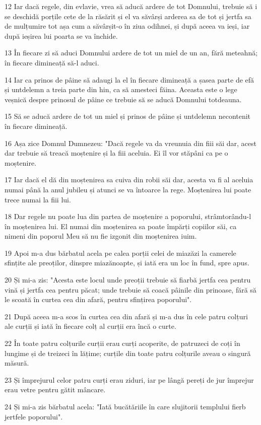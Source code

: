 \par 12 Iar dacă regele, din evlavie, vrea să aducă ardere de tot Domnului, trebuie să i se deschidă porțile cete de la răsărit și el va săvârși arderea sa de tot și jertfa sa de mulțumire tot așa cum a săvârșit-o în ziua odihnei, și după aceea va ieși, iar după ieșirea lui poarta se va închide.
\par 13 În fiecare zi să aduci Domnului ardere de tot un miel de un an, fără meteahnă; în fiecare dimineață să-l aduci.
\par 14 Iar ca prinos de pâine să adaugi la el în fiecare dimineață a șasea parte de efă și untdelemn a treia parte din hin, ca să amesteci făina. Aceasta este o lege veșnică despre prinosul de pâine ce trebuie să se aducă Domnului totdeauna.
\par 15 Să se aducă ardere de tot un miel și prinos de pâine și untdelemn necontenit în fiecare dimineață.
\par 16 Așa zice Domnul Dumnezeu: "Dacă regele va da vreunuia din fiii săi dar, acest dar trebuie să treacă moștenire și la fiii aceluia. Ei îl vor stăpâni ca pe o moștenire.
\par 17 Iar dacă el dă din moștenirea sa cuiva din robii săi dar, acesta va fi al aceluia numai până la anul jubileu și atunci se va întoarce la rege. Moștenirea lui poate trece numai la fiii lui.
\par 18 Dar regele nu poate lua din partea de moștenire a poporului, strâmtorându-l în moștenirea lui. El numai din moștenirea sa poate împărți copiilor săi, ca nimeni din poporul Meu să nu fie izgonit din moștenirea iuim.
\par 19 Apoi m-a dus bărbatul acela pe calea porții celei de miazăzi la camerele sfințite ale preoților, dinspre miazănoapte, și iată era un loc în fund, spre apus.
\par 20 Și mi-a zis: "Acesta este locul unde preoții trebuie să fiarbă jertfa cea pentru vină și jertfa cea pentru păcat; unde trebuie să coacă pâinile din prinoase, fără să le scoată în curtea cea din afară, pentru sfințirea poporului".
\par 21 După aceea m-a scos în curtea cea din afară și m-a dus în cele patru colțuri ale curții și iată în fiecare colț al curții era încă o curte.
\par 22 În toate patru colțurile curții erau curți acoperite, de patruzeci de coți în lungime și de treizeci în lățime; curțile din toate patru colțurile aveau o singură măsură.
\par 23 Și împrejurul celor patru curți erau ziduri, iar pe lângă pereți de jur împrejur erau vetre pentru gătit mâncare.
\par 24 Și mi-a zis bărbatul acela: "Iată bucătăriile în care slujitorii templului fierb jertfele poporului".

